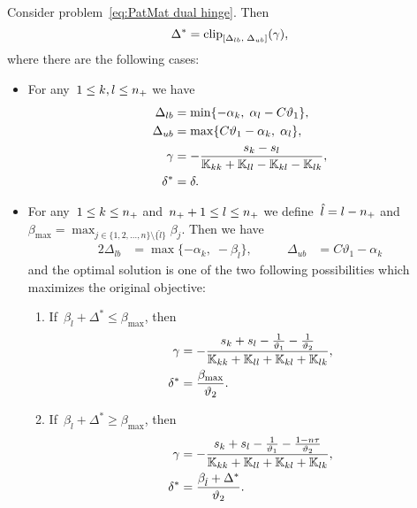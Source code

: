 \begin{theorem}\label{thm:Update rule PatMat with hinge loss}
  Consider problem~\eqref{eq:PatMat dual hinge}. Then
  \begin{equation*}
      \Delta^{*} = \clip{\Delta_{lb}}{\Delta_{ub}}{\gamma},
  \end{equation*}
  where there are the following cases:
  \begin{itemize}
    \item For any~$1\le k, l \le n_{+}$ we have
    \begin{align*}
      \Delta_{lb} & = \min\{- \alpha_k,\; \alpha_l - C \vartheta_1\}, \\
      \Delta_{ub} & = \max\{C \vartheta_1 - \alpha_k,\; \alpha_l\}, \\
      \gamma      & = -\frac{s_k - s_l}{\mathbb{K}_{kk} + \mathbb{K}_{ll} - \mathbb{K}_{kl} - \mathbb{K}_{lk}}, \\
      \delta^{*}  & = \delta.
    \end{align*}

    \item For any~$1 \le k \le n_{+}$ and~$n_{+} + 1 \le l \le n_{+}$ we define~$\hat{l} = l - n_{+}$ and~$\beta_{\max} = \max_{j \in \{1, 2, \ldots, n\} \setminus \{\hat l\}} \beta_j.$ Then we have
    \begin{alignat*}{2}
      \Delta_{lb} & = \max\{- \alpha_k,\; -\beta_{\hat{l}} \}, & \qquad
      \Delta_{ub} & = C \vartheta_1 - \alpha_k
    \end{alignat*}
    and the optimal solution is one of the two following possibilities which maximizes the original objective:
    \begin{enumerate}
      \item If~$\beta_{\hat{l}} + \Delta^{*} \leq \beta_{\max}$, then
      \begin{align*}
        \gamma & = -\frac{s_k + s_l - \frac{1}{\vartheta_1} - \frac{1}{\vartheta_2}}{\mathbb{K}_{kk} + \mathbb{K}_{ll} + \mathbb{K}_{kl} + \mathbb{K}_{lk}}, \\
        \delta^{*} & = \frac{\beta_{\max}}{\vartheta_2}.
      \end{align*}
      \item If~$\beta_{\hat{l}} + \Delta^{*} \ge \beta_{\max}$, then
      \begin{align*}
        \gamma & = -\frac{s_k + s_l - \frac{1}{\vartheta_1} - \frac{1 - n\tau}{\vartheta_2}}{\mathbb{K}_{kk} + \mathbb{K}_{ll} + \mathbb{K}_{kl} + \mathbb{K}_{lk}}, \\
        \delta^{*} & = \frac{\beta_{\hat{l}} + \Delta^{*}}{\vartheta_2}.
      \end{align*}
    \end{enumerate}


\end{itemize}
\end{theorem}
